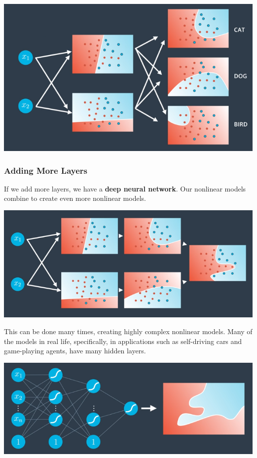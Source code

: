 \includegraphics[width=1\linewidth]{img//intro//introNN/neural-network-architecture-12.png}

\subsubsection{Adding More Layers}

If we add more layers, we have a \textbf{deep neural network}. Our nonlinear models combine to create even more nonlinear models.

\includegraphics[width=1\linewidth]{img//intro//introNN/neural-network-architecture-13.png}

This can be done many times, creating highly complex nonlinear models. Many of the models in real life, specifically, in applications such as self-driving cars and game-playing agents, have many hidden layers.

\includegraphics[width=1\linewidth]{img//intro//introNN/neural-network-architecture-14.png}

